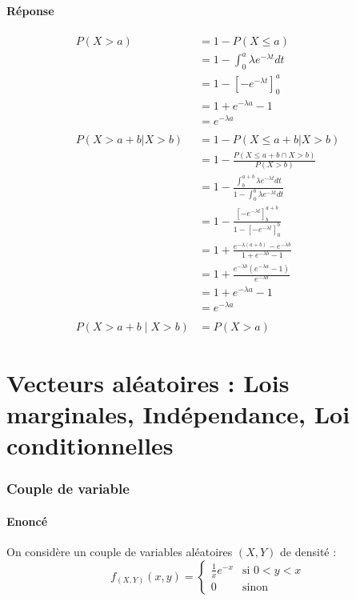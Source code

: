 \documentclass[10pt,a4paper,twoside]{article}
\begin{document}
\subsection*{Réponse}
\begin{align*}
P(X>a) &= 1-P(X\leqslant a)\\
&= 1-\int_{0}^{a}\lambda e^{-\lambda t}dt\\
&= 1-\left[ -e^{-\lambda t} \right]_{0}^{a}\\
&= 1 + e^{-\lambda a} - 1\\
&= e^{-\lambda a}\\
\\
P(X>a+b|X>b) &= 1-P(X\leqslant a+b | X>b)\\
&= 1-\frac{P(X\leqslant a+b \cap X>b)}{P(X>b)}\\
&= 1- \frac{\int_{b}^{a+b} \lambda e^{-\lambda t} dt}{1-\int_{0}^{b}\lambda e^{-\lambda t}dt}\\
&= 1-\frac{\left[ -e^{-\lambda t} \right]_{b}^{a+b}}{1-\left[ -e^{-\lambda t} \right]_{0}^{b}}\\
&= 1 + \frac{e^{-\lambda(a+b)} - e^{-\lambda b}}{1 + e^{-\lambda b} - 1}\\
&= 1 + \frac{e^{-\lambda b} (e^{-\lambda a} - 1)}{e^{-\lambda b}}\\
&= 1 + e^{-\lambda a} - 1\\
&= e^{-\lambda a}\\
\\
P(X>a+b\mid X>b) &= P(X>a)
\end{align*}



\newpage
\part{Vecteurs aléatoires : Lois marginales, Indépendance, Loi conditionnelles}
\setcounter{section}{0}
\section{Couple de variable}
\subsection*{Enoncé}
On considère un couple de variables aléatoires $(X,Y)$ de densité :
\[ f_{(X,Y)}(x,y) = 
\left\lbrace \begin{array}{ll}
\frac{1}{x}e^{-x} & \text{si }0<y<x\\
0 & \text{sinon}
\end{array}\right.
\]
\end{document}
